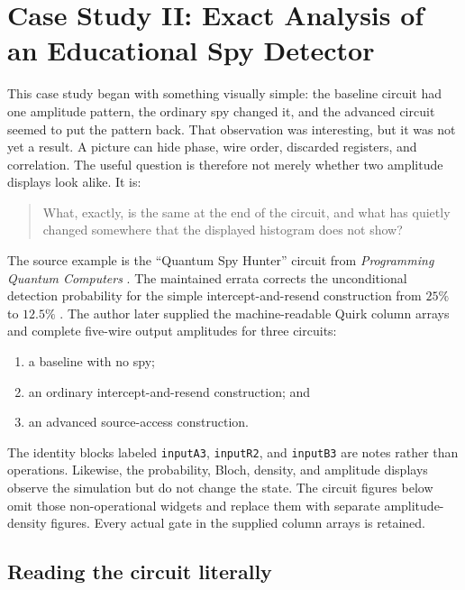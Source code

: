 \section{Case Study II: Exact Analysis of an Educational Spy Detector}
\label{sec:case-study-ii}

This case study began with something visually simple: the baseline circuit had
one amplitude pattern, the ordinary spy changed it, and the advanced circuit
seemed to put the pattern back. That observation was interesting, but it was not
yet a result. A picture can hide phase, wire order, discarded registers, and
correlation. The useful question is therefore not merely whether two amplitude
displays look alike. It is:

\begin{quote}
What, exactly, is the same at the end of the circuit, and what has quietly
changed somewhere that the displayed histogram does not show?
\end{quote}

The source example is the ``Quantum Spy Hunter'' circuit from
\emph{Programming Quantum Computers} \cite{johnston2019programming}. The
maintained errata corrects the unconditional detection probability for the
simple intercept-and-resend construction from $25\%$ to $12.5\%$
\cite{oreilly2026errata}. The author later supplied the machine-readable Quirk
column arrays and complete five-wire output amplitudes for three circuits:

\begin{enumerate}
  \item a baseline with no spy;
  \item an ordinary intercept-and-resend construction; and
  \item an advanced source-access construction.
\end{enumerate}

The identity blocks labeled \texttt{inputA3}, \texttt{inputR2}, and
\texttt{inputB3} are notes rather than operations. Likewise, the probability,
Bloch, density, and amplitude displays observe the simulation but do not change
the state. The circuit figures below omit those non-operational widgets and
replace them with separate amplitude-density figures. Every actual gate in the
supplied column arrays is retained.

\subsection{Reading the circuit literally}

